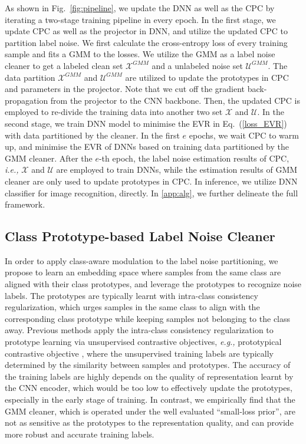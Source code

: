 \documentclass{article} \usepackage{iclr2023_conference,times}
\begin{document}
As shown in Fig.~\ref{fig:pipeline}, we update the DNN as well as the CPC by iterating a two-stage training pipeline in every epoch. In the first stage, we update CPC as well as the projector in DNN, and utilize the updated CPC to partition label noise. We first calculate the cross-entropy loss of every training sample and fits a GMM to the losses. We utilize the GMM as a label noise cleaner to get a labeled clean set $\mathcal{X}^{GMM}$ and a unlabeled noise set $\mathcal{U}^{GMM}$. The data partition $\mathcal{X}^{GMM}$ and $\mathcal{U}^{GMM}$ are utilized to update the prototypes in CPC and parameters in the projector. Note that we cut off the gradient back-propagation from the projector to the CNN backbone. Then, the updated CPC is employed to re-divide the training data into another two set $\mathcal{X}$ and $\mathcal{U}$. In the second stage, we train DNN model to minimise the EVR in Eq.~(\ref{loss_EVR}) with data partitioned by the cleaner. In the first $e$ epochs, we wait CPC to warm up, and minimise the EVR of DNNs based on training data partitioned by the GMM cleaner. After the $e$-th epoch, the label noise estimation results of CPC, \emph{i.e.,} $\mathcal{X}$ and $\mathcal{U}$ are employed to train DNNs, while the estimation results of GMM cleaner are only used to update prototypes in CPC. In inference, we utilize DNN classifier for image recognition, directly. In \ref{app:alg}, we further delineate the full framework.

\subsection{Class Prototype-based Label Noise Cleaner}
In order to apply class-aware modulation to the label noise partitioning, we propose to learn an embedding space where samples from the same class are aligned with their class prototypes, and leverage the prototypes to recognize noise labels. The prototypes are typically learnt with intra-class consistency regularization, which urges samples in the same class to align with the corresponding class prototype while keeping samples not belonging to the class away. Previous methods \citep{wang2022pico,li2020mopro} apply the intra-class consistency regularization to prototype learning via  unsupervised contrastive objectives, \emph{e.g.,} prototypical contrastive objective \citep{li2020prototypical}, where the unsupervised training labels are typically determined by the similarity between samples and prototypes. The 
accuracy of the training labels are highly depends on the quality of representation learnt by the CNN encoder, which would be too low to effectively update the prototypes, especially in the early stage of training. In contrast, we empirically find that the GMM cleaner, which is operated under the well evaluated ``small-loss prior'', are not as sensitive as the prototypes to the representation quality, and can provide more robust and accurate training labels. 
\end{document}
